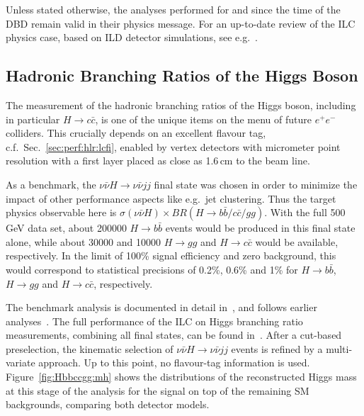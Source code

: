Unless stated otherwise, the analyses performed for and since the time of the DBD remain valid in their physics message. For an up-to-date review of the ILC physics case, based on ILD detector simulations, see e.g.~\cite{Bambade:2019fyw}.

\subsection{Hadronic Branching Ratios of the Higgs Boson}

The measurement of the hadronic branching ratios of the Higgs boson,
including in particular $H\to c\bar{c}$, is one of the unique items
on the menu of future $e^+e^-$ colliders. This crucially depends on 
an excellent flavour tag, c.f.\ Sec.~\ref{sec:perf:hlr:lcfi}, enabled
by vertex detectors with micrometer point resolution with a first layer placed as close as 1.6\,cm to the beam line.

As a benchmark, the $\nu \bar{\nu} H \to \nu \bar{\nu} jj$ final state was chosen in order to minimize the impact of other performance aspects like e.g.\ jet clustering. Thus the target physics observable here is $\sigma(\nu\bar{\nu} H)\times BR(H\to b\bar{b} / c\bar{c} / gg)$. With the full 500\,GeV data set, about 200000 $H \to b\bar{b}$ events would be produced in this final state alone, while about 30000 and 10000 $H \to gg$ and $H \to c\bar{c}$ would be available, respectively. In the 
limit of 100\% signal efficiency and zero background, this would correspond to statistical precisions of 0.2\%, 0.6\% and 1\% for $H \to b\bar{b}$, $H \to gg$ and $H \to c\bar{c}$, respectively.

The benchmark analysis is documented in detail in~\cite{ILDNote:Hbbccgg}, and follows earlier analyses~\cite{Mueller:2016exq,Ono:2013voc,Ono:2013sea}. The full performance of the ILC on Higgs branching ratio measurements, combining all final states,  can be found in~\cite{Bambade:2019fyw}. After a cut-based preselection, the kinematic selection of $\nu \bar{\nu} H \to \nu \bar{\nu} jj$ events is refined by a multi-variate approach. Up to this point, no flavour-tag information is used.
Figure~\ref{fig:Hbbccgg:mh} shows the distributions of the reconstructed Higgs mass at this stage of the analysis for the signal on top of the remaining SM backgrounds, comparing both detector models.

